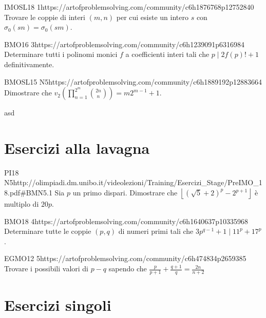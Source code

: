 \documentclass[12pt]{article}
\begin{document}
\begin{esercizio}{IMOSL18 1}{https://artofproblemsolving.com/community/c6h1876768p12752840}
    Trovare le coppie di interi $(m,n)$ per cui esiste un intero $s$ con $\sigma_0(sn)=\sigma_0(sm)$.
\end{esercizio}

\begin{esercizio}{BMO16 3}{https://artofproblemsolving.com/community/c6h1239091p6316984}
    Determinare tutti i polinomi monici $f$ a coefficienti interi tali che $p\mid 2f(p)!+1$ definitivamente.
\end{esercizio}

\begin{esercizio}{BMOSL15 N5}{https://artofproblemsolving.com/community/c6h1889192p12883664}
    Dimostrare che $v_2\left(\prod_{n=1}^{2^m}\binom{2n}{n}\right)=m2^{m-1}+1$.
\end{esercizio}

\begin{exercise}
asd
\end{exercise}


\section{Esercizi alla lavagna}

\begin{esercizio}{PI18 N5}{http://olimpiadi.dm.unibo.it/videolezioni/Training/Esercizi_Stage/PreIMO_18.pdf\#BMN5.1}
    Sia $p$ un primo dispari. Dimostrare che $\left\lfloor (\sqrt5+2)^p-2^{p+1} \right\rfloor$ è multiplo di $20p$.
\end{esercizio}

\begin{esercizio}{BMO18 4}{https://artofproblemsolving.com/community/c6h1640637p10335968}
    Determinare tutte le coppie $(p,q)$ di numeri primi tali che $3p^{q-1}+1\mid11^p+17^p$.
\end{esercizio}

\begin{esercizio}{EGMO12 5}{https://artofproblemsolving.com/community/c6h474834p2659385}
    Trovare i possibili valori di $p-q$ sapendo che $\frac{p}{p+1}+\frac{q+1}{q}=\frac{2n}{n+2}$
\end{esercizio}

\section{Esercizi singoli}
\end{document}

